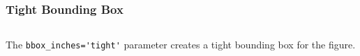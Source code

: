 \documentclass[xcolor={svgnames}]{beamer}
\newcommand{\pycode}[2][]{\lstinline[style=python,#1]{#2}}
\newcommand{\pyfile}[2][]{}
\begin{document}
\begin{frame}[fragile]
    \frametitle{Tight Bounding Box}
    \begin{columns}
        \begin{column}{0.52\textwidth}
            \pyfile{examples/03-savefig-tight.py}
        \end{column}
        \begin{column}{0.48\textwidth}
        \end{column}
    \end{columns}
    \small
    \vspace{15mm}
    \hspace{-1.97mm}
    The \pycode{bbox_inches='tight'} parameter creates a tight bounding
    box for the figure.
\end{frame}
\end{document}
